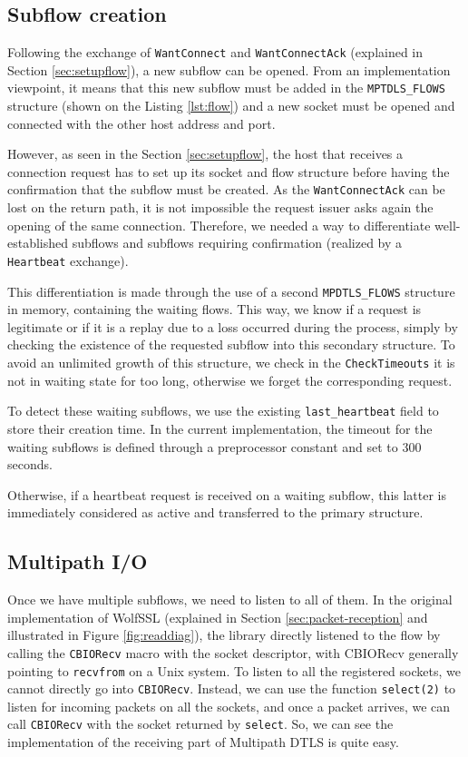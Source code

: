 \subsection{Subflow creation}

Following the exchange of \texttt{WantConnect} and \texttt{WantConnectAck} (explained in Section \ref{sec:setupflow}), a new subflow can be opened. From an implementation viewpoint, it means that this new subflow must be added in the \texttt{MPTDLS\_FLOWS} structure (shown on the Listing \ref{lst:flow}) and a new socket must be opened and connected with the other host address and port.

However, as seen in the Section \ref{sec:setupflow}, the host that receives a connection request has to set up its socket and flow structure before having the confirmation that the subflow must be created. As the \texttt{WantConnectAck} can be lost on the return path, it is not impossible the request issuer asks again the opening of the same connection. Therefore, we needed a way to differentiate well-established subflows and subflows requiring confirmation (realized by a \texttt{Heartbeat} exchange).

This differentiation is made through the use of a second \texttt{MPDTLS\_FLOWS} structure in memory, containing the waiting flows. This way, we know if a request is legitimate or if it is a replay due to a loss occurred during the process, simply by checking the existence of the requested subflow into this secondary structure. To avoid an unlimited growth of this structure, we check in the \texttt{CheckTimeouts} it is not in waiting state for too long, otherwise we forget the corresponding request.

To detect these waiting subflows, we use the existing \texttt{last\_heartbeat} field to store their creation time. In the current implementation, the timeout for the waiting subflows is defined through a preprocessor constant and set to 300 seconds.

Otherwise, if a heartbeat request is received on a waiting subflow, this latter is immediately considered as active and transferred to the primary structure.

\subsection{Multipath I/O}

Once we have multiple subflows, we need to listen to all of them. In the original implementation of WolfSSL (explained in Section \ref{sec:packet-reception} and illustrated in Figure \ref{fig:readdiag}), the library directly listened to the flow by calling the \texttt{CBIORecv} macro with the socket descriptor, with CBIORecv generally pointing to \texttt{recvfrom} on a Unix system. To listen to all the registered sockets, we cannot directly go into \texttt{CBIORecv}. Instead, we can use the function \texttt{select(2)} to listen for incoming packets on all the sockets, and once a packet arrives, we can call \texttt{CBIORecv} with the socket returned by \texttt{select}. So, we can see the implementation of the receiving part of Multipath DTLS is quite easy.

